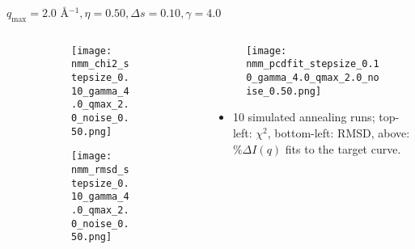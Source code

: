 \documentclass{beamer}
\begin{document}
\begin{frame}{$ q_{\textrm{max}}=2.0 $ \AA $^{-1}, \eta=0.50, \Delta s=0.10, \gamma=4.0$}
	\begin{columns}
		\begin{column}{.5\textwidth}
			\begin{figure}[H]
			\centering
			\begin{subfigure}[b]{\textwidth}
				\centering
				\texttt{[image: nmm\_chi2\_stepsize\_0.10\_gamma\_4.0\_qmax\_2.0\_noise\_0.50.png]}
				\label{fig:}
			\end{subfigure}
			\begin{subfigure}[b]{\textwidth}
				\centering
				\texttt{[image: nmm\_rmsd\_stepsize\_0.10\_gamma\_4.0\_qmax\_2.0\_noise\_0.50.png]}
				\label{fig:}
			\end{subfigure}
			\end{figure}
		\end{column}
		\begin{column}{.5\textwidth}
			\begin{figure}[H]
				\centering
				\texttt{[image: nmm\_pcdfit\_stepsize\_0.10\_gamma\_4.0\_qmax\_2.0\_noise\_0.50.png]}
				\label{fig:}
			\end{figure}
			\begin{itemize}
				\item 10 simulated annealing runs; top-left: $\chi^2$, bottom-left: RMSD, above: $\%\Delta I(q)$ fits to the target curve.
			\end{itemize}
		\end{column}
	\end{columns}
\end{frame}
 
\end{document}

